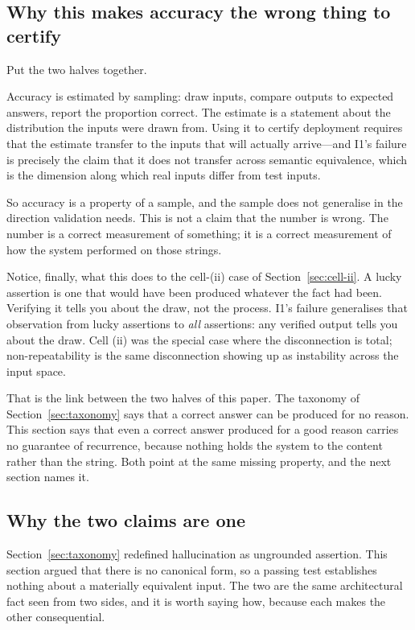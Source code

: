 \documentclass[11pt]{article}
\theoremstyle{plain}
\theoremstyle{definition}
\begin{document}
\subsection{Why this makes accuracy the wrong thing to certify}

Put the two halves together.

Accuracy is estimated by sampling: draw inputs, compare outputs to expected
answers, report the proportion correct. The estimate is a statement about the
distribution the inputs were drawn from. Using it to certify deployment requires
that the estimate transfer to the inputs that will actually arrive---and I1's
failure is precisely the claim that it does not transfer across semantic
equivalence, which is the dimension along which real inputs differ from test
inputs.

So accuracy is a property of a sample, and the sample does not generalise in the
direction validation needs. This is not a claim that the number is wrong. The
number is a correct measurement of something; it is a correct measurement of how
the system performed on those strings.

Notice, finally, what this does to the cell-(ii) case of
Section~\ref{sec:cell-ii}. A lucky assertion is one that would have been produced
whatever the fact had been. Verifying it tells you about the draw, not the
process. I1's failure generalises that observation from lucky assertions to
\emph{all} assertions: any verified output tells you about the draw. Cell (ii) was
the special case where the disconnection is total; non-repeatability is the same
disconnection showing up as instability across the input space.

That is the link between the two halves of this paper. The taxonomy of
Section~\ref{sec:taxonomy} says that a correct answer can be produced for no
reason. This section says that even a correct answer produced for a good reason
carries no guarantee of recurrence, because nothing holds the system to the
content rather than the string. Both point at the same missing property, and the
next section names it.

\subsection{Why the two claims are one}
\label{sec:unity}

Section~\ref{sec:taxonomy} redefined hallucination as ungrounded assertion. This
section argued that there is no canonical form, so a passing test establishes
nothing about a materially equivalent input. The two are the same architectural
fact seen from two sides, and it is worth saying how, because each makes the other
consequential.
\end{document}
